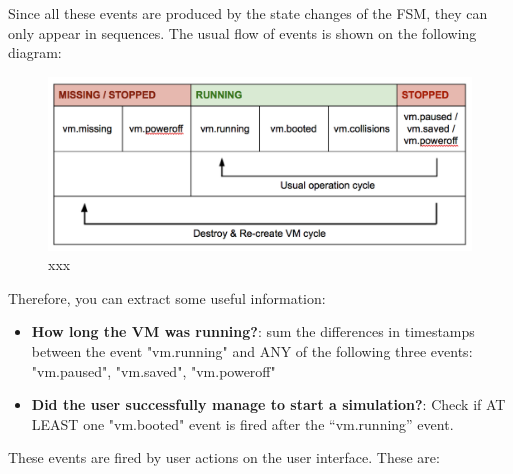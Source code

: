 \documentclass{article}
\begin{document}

Since all these events are produced by the state changes of the FSM, they can only appear in sequences. The usual flow of events is shown on the following diagram:

\begin{figure}[t]
  \begin{center}
		\includegraphics[width=\columnwidth]{imgs/sequenceOfEventsTable.png}
  \end{center}
\caption{xxx}
\label{xxx}
\end{figure}



Therefore, you can extract some useful information:

\begin{itemize}
\item {\bf How long the VM was running?}: sum the differences in timestamps between the event "vm.running" and ANY of the following three events: "vm.paused", "vm.saved", "vm.poweroff"

\item {\bf Did the user successfully manage to start a simulation?}: Check if AT LEAST one "vm.booted" event is fired after the “vm.running” event.
\end{itemize}



These events are fired by user actions on the user interface. These are:
\end{document}
